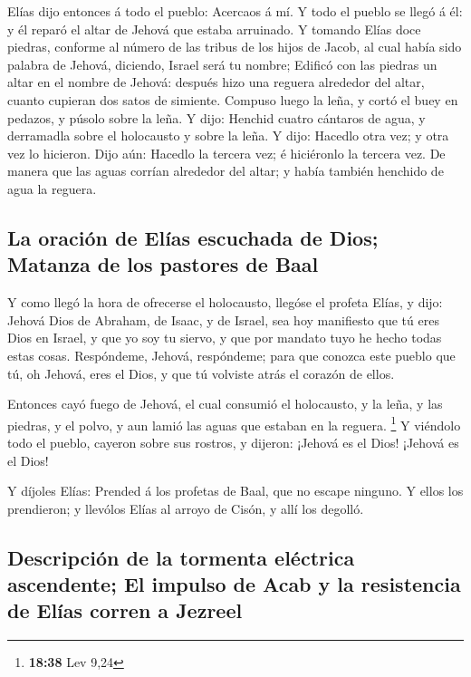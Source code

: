  Elías dijo entonces á todo el pueblo: Acercaos á mí. Y
todo el pueblo se llegó á él: y él reparó el altar de Jehová que estaba
arruinado.  Y tomando Elías doce piedras, conforme al
número de las tribus de los hijos de Jacob, al cual había sido palabra
de Jehová, diciendo, Israel será tu nombre;  Edificó con
las piedras un altar en el nombre de Jehová: después hizo una reguera
alrededor del altar, cuanto cupieran dos satos de simiente.
 Compuso luego la leña, y cortó el buey en pedazos, y
púsolo sobre la leña.  Y dijo: Henchid cuatro cántaros de
agua, y derramadla sobre el holocausto y sobre la leña. Y dijo: Hacedlo
otra vez; y otra vez lo hicieron. Dijo aún: Hacedlo la tercera vez; é
hiciéronlo la tercera vez.  De manera que las aguas corrían
alrededor del altar; y había también henchido de agua la reguera.

\hypertarget{la-oraciuxf3n-de-eluxedas-escuchada-de-dios-matanza-de-los-pastores-de-baal}{%
\subsection{La oración de Elías escuchada de Dios; Matanza de los
pastores de
Baal}\label{la-oraciuxf3n-de-eluxedas-escuchada-de-dios-matanza-de-los-pastores-de-baal}}

 Y como llegó la hora de ofrecerse el holocausto, llegóse
el profeta Elías, y dijo: Jehová Dios de Abraham, de Isaac, y de Israel,
sea hoy manifiesto que tú eres Dios en Israel, y que yo soy tu siervo, y
que por mandato tuyo he hecho todas estas cosas. 
Respóndeme, Jehová, respóndeme; para que conozca este pueblo que tú, oh
Jehová, eres el Dios, y que tú volviste atrás el corazón de ellos.

 Entonces cayó fuego de Jehová, el cual consumió el
holocausto, y la leña, y las piedras, y el polvo, y aun lamió las aguas
que estaban en la reguera. \footnote{\textbf{18:38} Lev 9,24}
 Y viéndolo todo el pueblo, cayeron sobre sus rostros, y
dijeron: ¡Jehová es el Dios! ¡Jehová es el Dios!

 Y díjoles Elías: Prended á los profetas de Baal, que no
escape ninguno. Y ellos los prendieron; y llevólos Elías al arroyo de
Cisón, y allí los degolló.

\hypertarget{descripciuxf3n-de-la-tormenta-eluxe9ctrica-ascendente-el-impulso-de-acab-y-la-resistencia-de-eluxedas-corren-a-jezreel}{%
\subsection{Descripción de la tormenta eléctrica ascendente; El impulso
de Acab y la resistencia de Elías corren a
Jezreel}\label{descripciuxf3n-de-la-tormenta-eluxe9ctrica-ascendente-el-impulso-de-acab-y-la-resistencia-de-eluxedas-corren-a-jezreel}}

